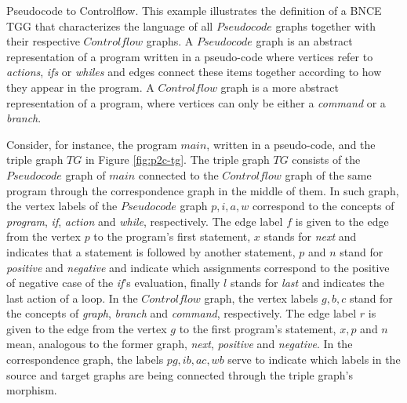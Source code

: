 \begin{example}{Pseudocode to Controlflow.}
	\label{ex:pseudocode2controlflow}
	This example illustrates the definition of a BNCE TGG that characterizes the language of all $Pseudocode$ graphs together with their respective $Controlflow$ graphs. A $Pseudocode$ graph is an abstract representation of a program written in a pseudo-code where vertices refer to \textit{actions}, \textit{ifs} or \textit{whiles} and edges connect these items together according to how they appear in the program. A $Controlflow$ graph is a more abstract representation of a program, where vertices can only be either a \textit{command} or a \textit{branch}.
	
	Consider, for instance, the program $main$, written in a pseudo-code, and the triple graph $TG$ in Figure \ref{fig:p2c-tg}. The triple graph $TG$ consists of the $Pseudocode$ graph of $main$ connected to the $Controlflow$ graph of the same program through the correspondence graph in the middle of them. In such graph, the vertex labels of the $Pseudocode$ graph $p, i, a, w$ correspond to the concepts of \textit{program}, \textit{if}, \textit{action} and \textit{while}, respectively. The edge label $f$ is given to the edge from the vertex $p$ to the program's first statement, $x$ stands for \textit{next} and indicates that a statement is followed by another statement, $p$ and $n$ stand for \textit{positive} and \textit{negative} and indicate which assignments correspond to the positive of negative case of the \textit{if}'s evaluation, finally $l$ stands for \textit{last} and indicates the last action of a loop. In the $Controlflow$ graph, the vertex labels $g, b, c$ stand for the concepts of \textit{graph}, \textit{branch} and \textit{command}, respectively. The edge label $r$ is given to the edge from the vertex $g$ to the first program's statement, $x, p$ and $n$ mean, analogous to the former graph, \textit{next}, \textit{positive} and \textit{negative}. In the correspondence graph, the labels $pg, ib, ac, wb$ serve to indicate which labels in the source and target graphs are being connected through the triple graph's morphism.
	
	
	

\end{example}
